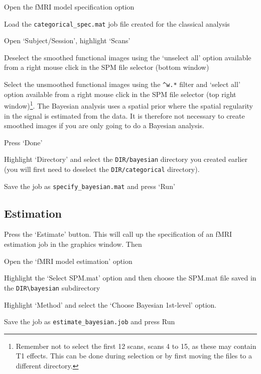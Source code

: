\bi
\item{Open the fMRI model specification option}
\item{Load the \verb!categorical_spec.mat! job file created for the classical analysis}
\item{Open `Subject/Session', highlight `Scans'} \item{Deselect the smoothed functional images using the `unselect all' option available from a right mouse click in the SPM file selector (bottom window)}
\item{Select the unsmoothed functional images using the \verb!^w.*! filter and `select all' option available from a right mouse click in the SPM file selector (top right window)\footnote{Remember not to select the first 12 scans, scans 4 to 15, as these may contain T1 effects. This can be done during selection or by first moving the files to a different directory.}. The Bayesian analysis uses a spatial prior where the spatial regularity in the signal is estimated from the data. It is therefore not necessary to create smoothed images if you are only going to do a Bayesian analysis.}
\item{Press `Done'}
\item{Highlight `Directory' and select the \verb!DIR/bayesian! directory you created earlier (you will first need to deselect the \verb!DIR/categorical! directory).}
\item{Save the job as \verb!specify_bayesian.mat! and press `Run'}
\ei

\subsection{Estimation}

Press the `Estimate' button. This will call up the specification of an fMRI estimation job in the graphics window. Then

\bi
\item{Open the `fMRI model estimation' option}
\item{Highlight the `Select SPM.mat' option and then choose the SPM.mat file saved in the \verb!DIR\bayesian! subdirectory}
\item{Highlight `Method' and select the `Choose Bayesian 1st-level' option.}
\item{Save the job as \verb!estimate_bayesian.job! and press Run}
\ei

